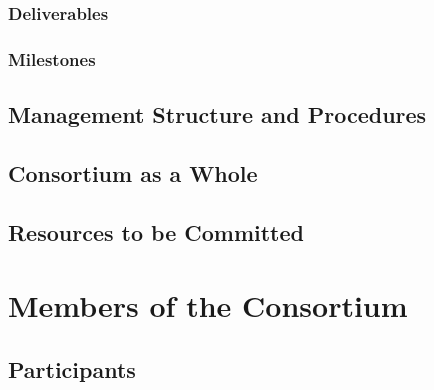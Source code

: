 \documentclass[noworkareas,deliverables,\classoptions]{euproposal}       %
\begin{document}
\begin{proposal}
\subsubsection{Deliverables}\label{sec:deliverables}

\subsubsection{Milestones}\label{sec:milestones}






\newpage
\subsection{Management Structure and Procedures}


\draftpage
\subsection{Consortium as a Whole}

\draftpage

\subsection{Resources to be Committed}



\newpage


\section{Members of the Consortium}


\subsection{Participants}


\end{proposal}
\end{document}
